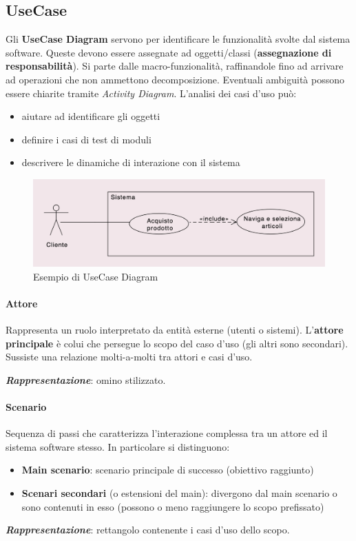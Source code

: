 \subsection{UseCase}

Gli \textbf{UseCase Diagram} servono per identificare le funzionalità svolte dal sistema software. Queste devono essere assegnate ad oggetti/classi (\textbf{assegnazione di responsabilità}). Si parte dalle macro-funzionalità, raffinandole fino ad arrivare ad operazioni che non ammettono decomposizione. Eventuali ambiguità possono essere chiarite tramite \textit{Activity Diagram}. L'analisi dei casi d'uso può:
\begin{itemize}
    \item aiutare ad identificare gli oggetti
    \item definire i casi di test di moduli
    \item descrivere le dinamiche di interazione con il sistema
\end{itemize}

\begin{figure}[H]
    \centering
    \includegraphics[width=0.75\linewidth]{assets/UML/use-case/use-case1.png}
    \caption{Esempio di UseCase Diagram}
    \label{fig:use-case1}
\end{figure}

\paragraph{Attore} Rappresenta un ruolo interpretato da entità esterne (utenti o sistemi). L'\textbf{attore principale} è colui che persegue lo scopo del caso d'uso (gli altri sono secondari). Sussiste una relazione molti-a-molti tra attori e casi d'uso.

\textbf{\textit{Rappresentazione}}: omino stilizzato.

\paragraph{Scenario} Sequenza di passi che caratterizza l'interazione complessa tra un attore ed il sistema software stesso. In particolare si distinguono:
\begin{itemize}
    \item \textbf{Main scenario}: scenario principale di successo (obiettivo raggiunto)
    \item \textbf{Scenari secondari} (o estensioni del main): divergono dal main scenario o sono contenuti in esso (possono o meno raggiungere lo scopo prefissato)
\end{itemize}
\textbf{\textit{Rappresentazione}}: rettangolo contenente i casi d'uso dello scopo.

